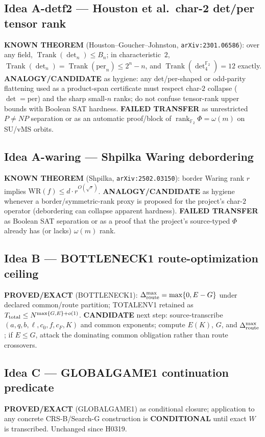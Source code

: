 \documentclass[11pt]{article}
\begin{document}
\subsection*{Idea A-detf2 --- Houston et al.\ char-2 det/per tensor rank}
\textbf{KNOWN THEOREM} (Houston--Goucher--Johnston, \texttt{arXiv:2301.06586}):
over any field, $\operatorname{Trank}(\det_n)\le B_n$; in characteristic~$2$,
$\operatorname{Trank}(\det_n)=\operatorname{Trank}(\mathrm{per}_n)\le 2^n-n$, and
$\operatorname{Trank}(\det_4^{\mathbb F_2})=12$ exactly.
\textbf{ANALOGY/CANDIDATE} as hygiene: any det/per-shaped or odd-parity
flattening used as a product-span certificate must respect char-$2$
collapse ($\det=\mathrm{per}$) and the sharp small-$n$ ranks; do not confuse
tensor-rank upper bounds with Boolean SAT hardness.
\textbf{FAILED TRANSFER} as unrestricted $P\neq NP$ separation or as an
automatic proof/block of $\operatorname{rank}_{\mathbb F_2}\Phi=\omega(m)$ on
SU/vMS orbits.

\subsection*{Idea A-waring --- Shpilka Waring debordering}
\textbf{KNOWN THEOREM} (Shpilka, \texttt{arXiv:2502.03150}): border Waring rank
$r$ implies $\mathrm{WR}(f)\le d\cdot r^{O(\sqrt r)}$.
\textbf{ANALOGY/CANDIDATE} as hygiene whenever a border/symmetric-rank proxy is
proposed for the project's char-$2$ operator (debordering can collapse apparent
hardness).
\textbf{FAILED TRANSFER} as Boolean SAT separation or as a proof that the
project's source-typed $\Phi$ already has (or lacks) $\omega(m)$ rank.

\subsection*{Idea B --- BOTTLENECK1 route-optimization ceiling}
\textbf{PROVED/EXACT} (BOTTLENECK1): $\Delta_{\rm route}^{\max}=\max\{0,E-G\}$
under declared common/route partition; TOTALENV1 retained as
$T_{\rm total}\le N^{\max\{G,E\}+o(1)}$.
\textbf{CANDIDATE} next step: source-transcribe $(a,q,b,\ell,c_0,f,c_F,K)$ and
common exponents; compute $E(K)$, $G$, and $\Delta_{\rm route}^{\max}$; if
$E\le G$, attack the dominating common obligation rather than route crossovers.

\subsection*{Idea C --- GLOBALGAME1 continuation predicate}
\textbf{PROVED/EXACT} (GLOBALGAME1) as conditional closure; application to any
concrete CRS-B/Search-G construction is \textbf{CONDITIONAL} until exact $W$
is transcribed. Unchanged since H0319.
\end{document}
